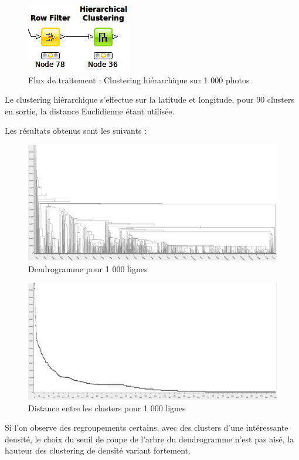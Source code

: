 \begin{figure}[H]
    \centering
    \includegraphics[width=0.25\linewidth]{img/knime_hierarchical.png}
    \caption{Flux de traitement : Clustering hiérarchique sur 1 000 photos}
\end{figure}

Le clustering hiérarchique s'effectue sur la latitude et longitude, pour 90 clusters en sortie, la distance Euclidienne étant utilisée.

Les résultats obtenus sont les suivants :
\begin{figure}[H]
    \centering
    \includegraphics[width=\linewidth]{img/1000_histo1.png}
    \caption{Dendrogramme pour 1 000 lignes}
\end{figure}

\begin{figure}[H]
    \centering
    \includegraphics[width=\linewidth]{img/1000_histo2.png}
    \caption{Distance entre les clusters pour 1 000 lignes}
\end{figure}

Si l'on observe des regroupements certains, avec des clusters d'une intéressante densité, le choix du seuil de coupe de l'arbre du dendrogramme n'est pas aisé, la hauteur des clustering de densité variant fortement.
\pagebreak



